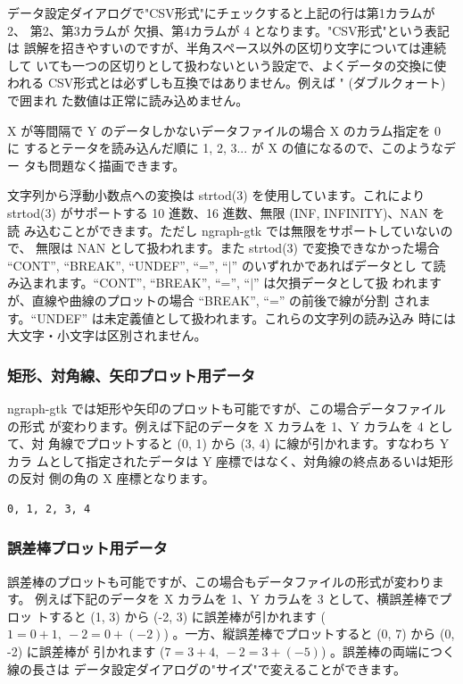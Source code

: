 \documentclass[mingoth,a4paper,twoside]{jsarticle}
\begin{document}
データ設定ダイアログで"CSV形式"にチェックすると上記の行は第1カラムが 2、
第2、第3カラムが 欠損、第4カラムが 4 となります。"CSV形式"という表記は
誤解を招きやすいのですが、半角スペース以外の区切り文字については連続して
いても一つの区切りとして扱わないという設定で、よくデータの交換に使われる
CSV形式とは必ずしも互換ではありません。例えば " (ダブルクォート) で囲まれ
た数値は正常に読み込めません。

X が等間隔で Y のデータしかないデータファイルの場合 X のカラム指定を 0 に
するとテータを読み込んだ順に 1, 2, 3... が X の値になるので、このようなデー
タも問題なく描画できます。

文字列から浮動小数点への変換は strtod(3) を使用しています。これにより
strtod(3) がサポートする 10 進数、16 進数、無限 (INF, INFINITY)、NAN を読
み込むことができます。ただし ngraph-gtk では無限をサポートしていないので、
無限は NAN として扱われます。また strtod(3) で変換できなかった場合
``CONT'', ``BREAK'', ``UNDEF'', ``='', ``$|$'' のいずれかであればデータとし
て読み込まれます。``CONT'', ``BREAK'', ``='', ``$|$'' は欠損データとして扱
われますが、直線や曲線のプロットの場合 ``BREAK'', ``='' の前後で線が分割
されます。``UNDEF'' は未定義値として扱われます。これらの文字列の読み込み
時には大文字・小文字は区別されません。

\subsubsection{矩形、対角線、矢印プロット用データ}

ngraph-gtk では矩形や矢印のプロットも可能ですが、この場合データファイルの形式
が変わります。例えば下記のデータを X カラムを 1、Y カラムを 4 として、対
角線でプロットすると (0, 1) から (3, 4) に線が引かれます。すなわち Y カラ
ムとして指定されたデータは Y 座標ではなく、対角線の終点あるいは矩形の反対
側の角の X 座標となります。

\begin{verbatim}
0, 1, 2, 3, 4
\end{verbatim}

\subsubsection{誤差棒プロット用データ}

誤差棒のプロットも可能ですが、この場合もデータファイルの形式が変わります。
例えば下記のデータを X カラムを 1、Y カラムを 3 として、横誤差棒でプロッ
トすると (1, 3) から (-2, 3) に誤差棒が引かれます ($1 = 0 + 1, \ -2 = 0
+ (-2)$) 。一方、縦誤差棒でプロットすると (0, 7) から (0, -2) に誤差棒が
引かれます ($7 = 3 + 4, \ -2 = 3 + (-5)$) 。誤差棒の両端につく線の長さは
データ設定ダイアログの"サイズ"で変えることができます。
\end{document}
